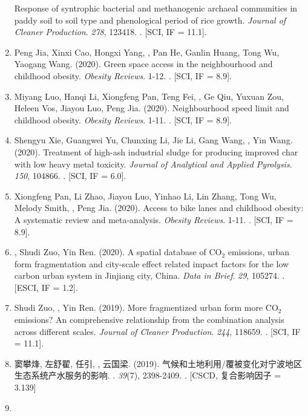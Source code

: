\begin{enumerate}
    Response of syntrophic bacterial and methanogenic archaeal communities in paddy soil to soil type and phenological period of rice growth.
    \textit{Journal of Cleaner Production}. \textit{278}, 123418.
    . [SCI, IF = 11.1].
\item
    Peng Jia, Xinxi Cao, Hongxi Yang, \Shaoqing, Pan He, Ganlin Huang, Tong Wu, Yaogang Wang. (2020).
    Green space access in the neighbourhood and childhood obesity.
    \textit{Obesity Reviews}. 1-12.
    . [SCI, IF = 8.9].
\item
    Miyang Luo, Hanqi Li, Xiongfeng Pan, Teng Fei, \Shaoqing, Ge Qiu, Yuxuan Zou, Heleen Vos, Jiayou Luo, Peng Jia. (2020).
    Neighbourhood speed limit and childhood obesity.
    \textit{Obesity Reviews}. 1-11.
    . [SCI, IF = 8.9].
\item
    Shengyu Xie, Guangwei Yu, Chunxing Li, Jie Li, Gang Wang, \Shaoqing, Yin Wang. (2020).
    Treatment of high-ash industrial sludge for producing improved char with low heavy metal toxicity.
    \textit{Journal of Analytical and Applied Pyrolysis}. \textit{150}, 104866.
    . [SCI, IF = 6.0].
\item
    Xiongfeng Pan, Li Zhao, Jiayou Luo, Yinhao Li, Lin Zhang, Tong Wu, Melody Smith, \Shaoqing, Peng Jia. (2020).
    Access to bike lanes and childhood obesity: A systematic review and meta‐analysis.
    \textit{Obesity Reviews}. 1-11.
    . [SCI, IF = 8.9].
\item
    \Shaoqing, Shudi Zuo, Yin Ren. (2020).
    A spatial database of CO$_2$ emissions, urban form fragmentation and city-scale effect related impact factors for the low carbon urban system in Jinjiang city, China.
    \textit{Data in Brief}. \textit{29}, 105274.
    . [ESCI, IF = 1.2].
\item
    Shudi Zuo, \Shaoqing, Yin Ren. (2019).
    More fragmentized urban form more CO$_2$ emissions? An comprehensive relationship from the combination analysis across different scales.
    \textit{Journal of Cleaner Production}. \textit{244}, 118659.
    . [SCI, IF = 11.1].
\item
    窦攀烽, 左舒翟, 任引, {}, 云国梁. (2019).
    气候和土地利用/覆被变化对宁波地区生态系统产水服务的影响.
    {}. \textit{39}(7), 2398-2409.
    . [CSCD, 复合影响因子 = 3.139] 
\item

\end{enumerate}

